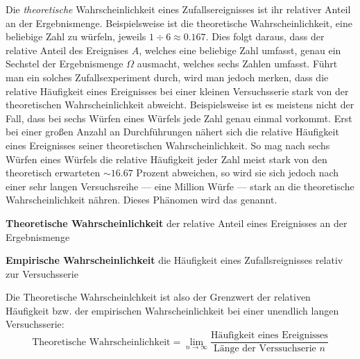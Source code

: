 Die \emph{theoretische} Wahrscheinlichkeit eines Zufallsereignisses ist ihr relativer Anteil an der Ergebnismenge. Beispielsweise ist die theoretische Wahrscheinlichkeit, eine beliebige Zahl zu w\"{u}rfeln, jeweils $1 \div 6 \approx 0.167$. Dies folgt daraus, dass der relative Anteil des Ereignises $A$, welches eine beliebige Zahl umfasst, genau ein Sechstel der Ergebnismenge $\Omega$ ausmacht, welches sechs Zahlen umfasst. F\"{u}hrt man ein solches Zufallsexperiment durch, wird man jedoch merken, dass die relative H\"{a}ufigkeit eines Ereignisses bei einer kleinen Versuchsserie stark von der theoretischen Wahrscheinlichkeit abweicht. Beispielsweise ist es meistens nicht der Fall, dass bei sechs W\"{u}rfen eines W\"{u}rfels jede Zahl genau einmal vorkommt. Erst bei einer gro\ss{}en Anzahl an Durchf\"{u}hrungen n\"{a}hert sich die relative H\"{a}ufigkeit eines Ereignisses seiner theoretischen Wahrscheinlichkeit. So mag nach sechs W\"{u}rfen eines W\"{u}rfels die relative H\"{a}ufigkeit jeder Zahl meist stark von den theoretisch erwarteten $\sim 16.67$ Prozent abweichen, so wird sie sich jedoch nach einer sehr langen Versuchsreihe --- eine Million W\"{u}rfe --- stark an die theoretische Wahrscheinlichkeit n\"{a}hren. Dieses Ph\"{a}nomen wird das  genannt.

\pagebreak

\textbf{Theoretische Wahrscheinlichkeit}  der relative Anteil eines Ereignisses an der Ergebnismenge

\textbf{Empirische Wahrscheinlichkeit}  die H\"{a}ufigkeit eines Zufallsreignisses relativ zur Versuchsserie

Die Theoretische Wahrscheinlchkeit ist also der Grenzwert der relativen H\"{a}ufigkeit bzw. der empirischen Wahrscheinlichkeit bei einer unendlich langen Versuchsserie: $$\text{Theoretische Wahrscheinlichkeit} = \lim_{n \rightarrow \infty} \frac{\text{H\"{a}ufigkeit eines Ereignisses}}{\text{L\"{a}nge der Verssuchserie } n}$$

